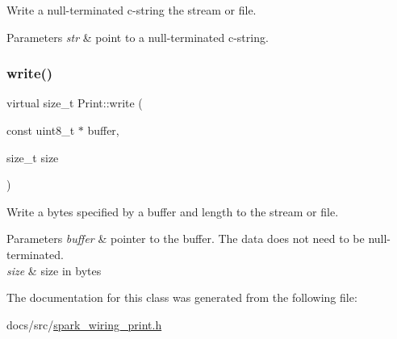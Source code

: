Write a null-\/terminated c-\/string the stream or file. 


\begin{DoxyParams}{Parameters}
{\em str} & point to a null-\/terminated c-\/string. \\
\hline
\end{DoxyParams}
\mbox{\label{class_print_a88864e109589a5be9b0f5ba1327f8421}} 
\subsubsection{\texorpdfstring{write()}{write()}\hspace{0.1cm}{\footnotesize\ttfamily [3/3]}}
{\footnotesize\ttfamily virtual size\+\_\+t Print\+::write (\begin{DoxyParamCaption}\item[{const uint8\+\_\+t $\ast$}]{buffer,  }\item[{size\+\_\+t}]{size }\end{DoxyParamCaption})\hspace{0.3cm}{\ttfamily [virtual]}}



Write a bytes specified by a buffer and length to the stream or file. 


\begin{DoxyParams}{Parameters}
{\em buffer} & pointer to the buffer. The data does not need to be null-\/terminated. \\
\hline
{\em size} & size in bytes \\
\hline
\end{DoxyParams}


The documentation for this class was generated from the following file\+:\begin{DoxyCompactItemize}
\item 
docs/src/\mbox{\hyperlink{spark__wiring__print_8h}{spark\+\_\+wiring\+\_\+print.\+h}}\end{DoxyCompactItemize}
